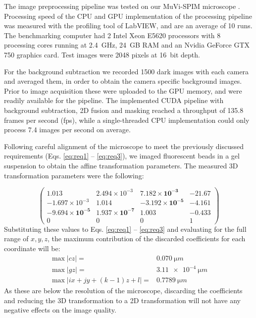   The image preprocessing pipeline was tested on our MuVi-SPIM microscope \cite{krzic_multiview_2012}.   
  Processing speed of the CPU and GPU implementation of the processing pipeline was measured with the profiling tool of LabVIEW, and are an average of 10 runs. The benchmarking computer had 2 Intel Xeon E5620 processors with 8 processing cores running at \SI{2.4}{GHz}, \SI{24}{GB} RAM and an Nvidia GeForce GTX 750 graphics card. Test images were 2048 pixels at \SI{16}{bit} depth. 
  
  For the background subtraction we recorded 1500 dark images with each camera and averaged them, in order to obtain the camera specific background images. Prior to image acquisition these were uploaded to the GPU memory, and were readily available for the pipeline. The implemented CUDA pipeline with background subtraction, 2D fusion and masking reached a throughput of 135.8 frames per second (fps), while a single-threaded CPU implementation could only process 7.4 images per second on average.

  

  Following careful alignment of the microscope to meet the previously discussed requirements (Eqs. \ref{eq:req1} -- \ref{eq:req3}), we imaged fluorescent beads in a gel suspension to obtain the affine transformation parameters. The measured 3D transformation parameters were the following:

  \[
  \begin{pmatrix}
    1.013 & 2.494\times 10^{-3} & \mathbf{7.182\times 10^{-3}} & -21.67 \\
    -1.697\times 10^{-3} & 1.014 & \mathbf{-3.192\times 10^{-5}} & -4.161 \\
    \mathbf{-9.694\times 10^{-5}} & \mathbf{1.937\times 10^{-7}} & \mathbf{1.003} & \mathbf{-0.433} \\
    0 & 0 & 0 & 1
  \end{pmatrix}
  \]
  Substituting these values to Eqs. \ref{eq:req1} -- \ref{eq:req3} and evaluating for the full range of $x, y, z$, the maximum contribution of the discarded coefficients for each coordinate will be:
  \begin{align*}
    \max |cz| =& \SI{0.070}{\micro m}  \\
    \max |gz| =& \SI{3.11e-4}{\micro m}  \\
    \max | i x + j y + (k-1)  z + l | =& \SI{0.7789}{\micro m}
  \end{align*}
  As these are below the resolution of the microscope, discarding the coefficients and reducing the 3D transformation to a 2D transformation will not have any negative effects on the image quality.

